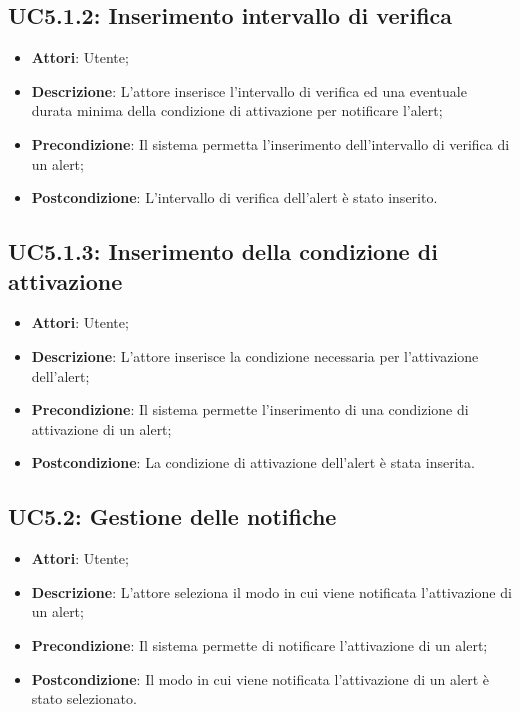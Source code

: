 \subsection{UC5.1.2: Inserimento intervallo di verifica}
\begin{itemize}
	\item \textbf{Attori}: Utente;
	\item \textbf{Descrizione}: L'attore inserisce l'intervallo di verifica ed una eventuale durata minima della condizione di attivazione per notificare l'alert;
	\item \textbf{Precondizione}: Il sistema permetta l'inserimento dell'intervallo di verifica di un alert;
	\item \textbf{Postcondizione}: L'intervallo di verifica dell'alert è stato inserito.
\end{itemize}

\subsection{UC5.1.3: Inserimento della condizione di attivazione}
\begin{itemize}
	\item \textbf{Attori}: Utente;
	\item \textbf{Descrizione}: L'attore inserisce la condizione necessaria per l'attivazione dell'alert;
	\item \textbf{Precondizione}: Il sistema permette l'inserimento di una condizione di attivazione di un alert;
	\item \textbf{Postcondizione}: La condizione di attivazione dell'alert è stata inserita.
\end{itemize}

\subsection{UC5.2: Gestione delle notifiche}
\begin{itemize}
	\item \textbf{Attori}: Utente;
	\item \textbf{Descrizione}: L'attore seleziona il modo in cui viene notificata l'attivazione di un alert;
	\item \textbf{Precondizione}: Il sistema permette di notificare l'attivazione di un alert;
	\item \textbf{Postcondizione}: Il modo in cui viene notificata l'attivazione di un alert è stato selezionato.
\end{itemize}

